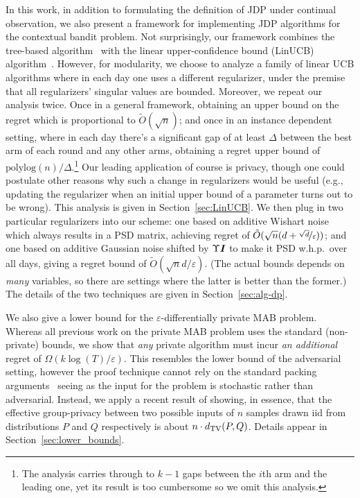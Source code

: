 \documentclass{article}
\newcommand{\Eye}[1][]{\bm{I}\notblank{#1}{_{{#1}\times{#1}}}{}}
\begin{document}
In this work, in addition to formulating the definition of JDP under
continual observation, we also present a framework for implementing
JDP algorithms for the contextual bandit problem. Not surprisingly,
our framework combines the tree-based algorithm~\cite{ChanPrivateContinualRelease2010,DworkContinualObservation2010}  with the linear
upper-confidence bound (LinUCB) algorithm~\cite{DaniStochasticLinearOptimization2008}.  However, for modularity,
we choose to analyze a family of linear UCB algorithms where in each
day one uses a different regularizer, under the premise that all
regularizers' singular values are bounded. Moreover, we repeat our analysis twice. Once in a general framework,
obtaining an upper bound on the regret which is proportional to
$\tilde O(\sqrt n)$; and once in an instance dependent setting, where in each
day there's a significant gap of at least $\Delta$ between the best arm of each round and any other
arms, obtaining a regret upper bound of $\mathrm{polylog}(n)/\Delta$.\footnote{The analysis carries through to $k-1$ gaps between the $i$th
arm and the leading one, yet its result is too cumbersome so we omit
this analysis.} Our leading application of course is privacy, though
one could postulate other reasons why such a change in regularizers
would be useful (e.g., updating the regularizer when an initial upper
bound of a parameter turns out to be wrong). This analysis is given in Section~\ref{sec:LinUCB}. We then plug in two
particular regularizers into our scheme: one based on additive Wishart
noise~\citep{SheffetPrivateApproxRegression2015} which always results
in a PSD matrix, achieving regret of $\tilde O(\sqrt{n}(d+\nicefrac{\sqrt d}{\varepsilon}))$; and one based on additive Gaussian
noise \citep{DworkAnalyzeGauss2014} shifted by $\Upsilon\Eye$ to make
it PSD w.h.p.\ over all days, giving a regret bound of $\tilde O(\sqrt n d/\varepsilon)$. (The actual bounds depends on \emph{many} variables, so there are settings where the latter is better than the former.) The details of the two techniques are given in Section~\ref{sec:alg-dp}.

We also give a lower bound for the $\varepsilon$-differentially private
MAB problem. Whereas all previous work on the private MAB problem uses
the standard (non-private) bounds, we show that
\emph{any} private algorithm must incur \emph{an additional} regret of
$\Omega(k\log(T)/\varepsilon)$. This resembles the lower bound of the
adversarial setting, however the proof technique cannot rely on the
standard packing arguments~\citep[e.g.][]{HardtTalwarGeometryDP2010} seeing as the input for the
problem is stochastic rather than adversarial.  Instead, we apply a
recent result of \citet{KarwaVadhanFiniteSampleDP2017} showing, in essence,
that the effective group-privacy between two possible inputs of $n$
samples drawn iid from distributions $P$ and $Q$ respectively is about
$n\cdot d_{\rm TV}(P,Q)$. Details appear in Section~\ref{sec:lower_bounds}.
\end{document}
